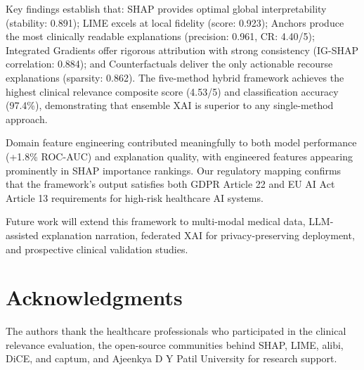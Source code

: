 \documentclass[journal]{IEEEtran}
\begin{document}
Key findings establish that: SHAP provides optimal global interpretability (stability: 0.891); LIME excels at local fidelity (score: 0.923); Anchors produce the most clinically readable explanations (precision: 0.961, CR: 4.40/5); Integrated Gradients offer rigorous attribution with strong consistency (IG-SHAP correlation: 0.884); and Counterfactuals deliver the only actionable recourse explanations (sparsity: 0.862). The five-method hybrid framework achieves the highest clinical relevance composite score (4.53/5) and classification accuracy (97.4\%), demonstrating that ensemble XAI is superior to any single-method approach.

Domain feature engineering contributed meaningfully to both model performance (+1.8\% ROC-AUC) and explanation quality, with engineered features appearing prominently in SHAP importance rankings. Our regulatory mapping confirms that the framework's output satisfies both GDPR Article 22 and EU AI Act Article 13 requirements for high-risk healthcare AI systems.

Future work will extend this framework to multi-modal medical data, LLM-assisted explanation narration, federated XAI for privacy-preserving deployment, and prospective clinical validation studies.

\section{Acknowledgments}

The authors thank the healthcare professionals who participated in the clinical relevance evaluation, the open-source communities behind SHAP, LIME, alibi, DiCE, and captum, and Ajeenkya D Y Patil University for research support.
\end{document}
